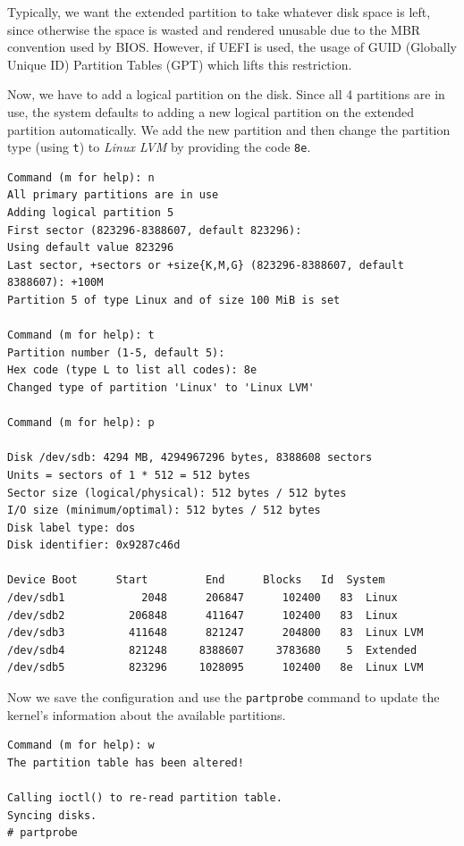 \noindent
Typically, we want the extended partition to take whatever disk space is left, since otherwise the space is wasted and rendered unusable due to the MBR convention used by BIOS. However, if UEFI is used, the usage of GUID (Globally Unique ID) Partition Tables (GPT) which lifts this restriction. 

Now, we have to add a logical partition on the disk. Since all 4 partitions are in use, the system defaults to adding a new logical partition on the extended partition automatically. We add the new partition and then change the partition type (using \verb|t|) to \textit{Linux LVM} by providing the code \verb|8e|. 

\vspace{-15pt}
\begin{verbatim}
Command (m for help): n
All primary partitions are in use
Adding logical partition 5
First sector (823296-8388607, default 823296): 
Using default value 823296
Last sector, +sectors or +size{K,M,G} (823296-8388607, default 8388607): +100M
Partition 5 of type Linux and of size 100 MiB is set

Command (m for help): t
Partition number (1-5, default 5): 
Hex code (type L to list all codes): 8e
Changed type of partition 'Linux' to 'Linux LVM'

Command (m for help): p

Disk /dev/sdb: 4294 MB, 4294967296 bytes, 8388608 sectors
Units = sectors of 1 * 512 = 512 bytes
Sector size (logical/physical): 512 bytes / 512 bytes
I/O size (minimum/optimal): 512 bytes / 512 bytes
Disk label type: dos
Disk identifier: 0x9287c46d

Device Boot      Start         End      Blocks   Id  System
/dev/sdb1            2048      206847      102400   83  Linux
/dev/sdb2          206848      411647      102400   83  Linux
/dev/sdb3          411648      821247      204800   83  Linux LVM
/dev/sdb4          821248     8388607     3783680    5  Extended
/dev/sdb5          823296     1028095      102400   8e  Linux LVM
\end{verbatim}
\vspace{-10pt}

\noindent
Now we save the configuration and use the \verb|partprobe| command to update the kernel's information about the available partitions. 

\vspace{-15pt}
\begin{verbatim}
Command (m for help): w
The partition table has been altered!

Calling ioctl() to re-read partition table.
Syncing disks.
# partprobe
\end{verbatim}
\vspace{-10pt}

